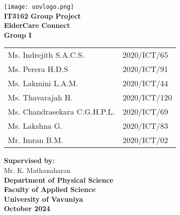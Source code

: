 \documentclass[a4paper,12pt]{article}
\begin{document}
\begin{titlepage}
    \begin{center}
        \texttt{[image: uovlogo.png]} \\[1cm]

        
        \textbf{\LARGE \textbf{IT3162 Group Project}} \\[1cm]

         \textbf{\LARGE ElderCare Connect} \\[1.5cm]
       
        \textbf{{\Large Group I}} \\[1cm]
        \begin{tabular}{ll}
            \large Ms. Indrejith S.A.C.S.       & \large 2020/ICT/65 \\ [0.5cm]
            \large Ms. Perera H.D.S             & \large 2020/ICT/91 \\ [0.5cm]
            \large Ms. Lakmini L.A.M.           & \large 2020/ICT/44 \\ [0.5cm]
            \large Ms. Thavarajah H.            & \large 2020/ICT/120 \\ [0.5cm]
            \large Ms. Chandrasekara C.G.H.P.L. & \large 2020/ICT/69 \\ [0.5cm]
            \large Ms. Lakshna G.               & \large 2020/ICT/83 \\ [0.5cm]
            \large Mr. Imran B.M.               & \large 2020/ICT/02 \\ [1.5cm]
        \end{tabular}

        \textbf{\Large Supervised by:} \\ [0.5cm]
        \large Mr. K. Mathanaharan \\[1.5 cm]

        \textbf{\Large Department of Physical Science} \\ [0.25cm]
        \textbf{ \Large Faculty of Applied Science} \\ [0.25cm]
        \textbf{\Large University of Vavuniya} \\ [0.25cm]
        \textbf{\Large October 2024} \\ [0.25cm]

       
    \end{center}
\end{titlepage}
\end{document}
